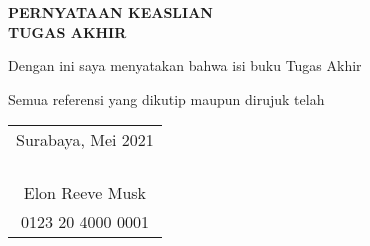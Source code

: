 \begin{center}
  \large\textbf{PERNYATAAN KEASLIAN\\TUGAS AKHIR}
\end{center}

\thispagestyle{empty}

\vspace{2ex}


Dengan ini saya menyatakan bahwa isi buku Tugas Akhir \lipsum[1][1-6]

Semua referensi yang dikutip maupun dirujuk telah \lipsum[2][1-4]

\vspace{4ex}

\begin{flushright}
  \begin{tabular}[b]{c}
    Surabaya, Mei 2021\\
    \\
    \\
    \\
    \\
    Elon Reeve Musk\\
    0123 20 4000 0001
  \end{tabular}
\end{flushright}
